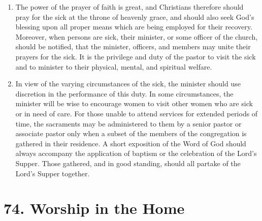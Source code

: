 \documentclass[
]{book}
\providecommand{\tightlist}{%
  \setlength{\itemsep}{0pt}\setlength{\parskip}{0pt}}
\begin{document}
\begin{enumerate}
\def\labelenumi{\arabic{enumi}.}
\tightlist
\item
  \protect\hypertarget{73}{\href{}{}}The power of the prayer of faith is great, and Christians therefore should pray for the sick at the throne of heavenly grace, and should also seek God's blessing upon all proper means which are being employed for their recovery. Moreover, when persons are sick, their minister, or some officer of the church, should be notified, that the minister, officers, and members may unite their prayers for the sick. It is the privilege and duty of the pastor to visit the sick and to minister to their physical, mental, and spiritual welfare.
\item
  In view of the varying circumstances of the sick, the minister should use discretion in the performance of this duty. In some circumstances, the minister will be wise to encourage women to visit other women who are sick or in need of care. For those unable to attend services for extended periods of time, the sacraments may be administered to them by a senior pastor or associate pastor only when a subset of the members of the congregation is gathered in their residence. A short exposition of the Word of God should always accompany the application of baptism or the celebration of the Lord's Supper. Those gathered, and in good standing, should all partake of the Lord's Supper together.
\end{enumerate}

\hypertarget{worship-in-the-home}{%
\section*{74. Worship in the Home}\label{worship-in-the-home}}

\protect\hypertarget{chapter-slug-74-worship-in-the-home}{\href{}{}}
\end{document}
